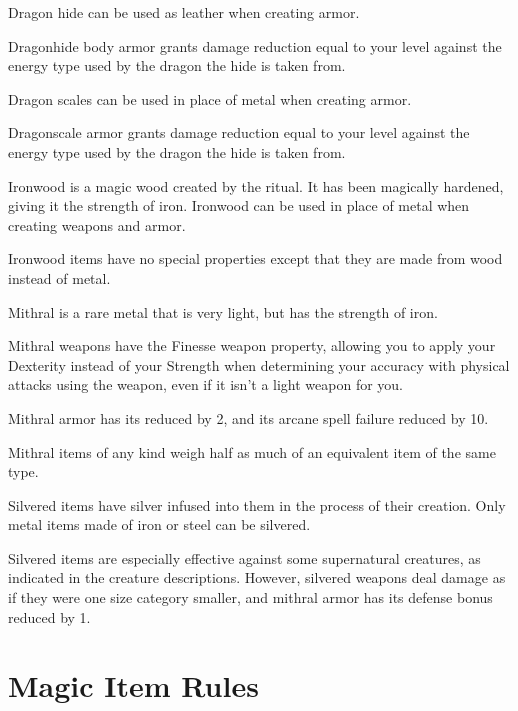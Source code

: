         Dragon hide can be used as leather when creating armor.

        Dragonhide body armor grants damage reduction equal to your level against the energy type used by the dragon the hide is taken from.


        Dragon scales can be used in place of metal when creating armor.

        Dragonscale armor grants damage reduction equal to your level against the energy type used by the dragon the hide is taken from.

        Ironwood is a magic wood created by the  ritual.
        It has been magically hardened, giving it the strength of iron.
        Ironwood can be used in place of metal when creating weapons and armor.

        Ironwood items have no special properties except that they are made from wood instead of metal.

        Mithral is a rare metal that is very light, but has the strength of iron.

        Mithral weapons have the Finesse weapon property, allowing you to apply your Dexterity instead of your Strength when determining your accuracy with physical attacks using the weapon, even if it isn't a light weapon for you.

        Mithral armor has its  reduced by 2, and its arcane spell failure reduced by 10.

        Mithral items of any kind weigh half as much of an equivalent item of the same type.


        Silvered items have silver infused into them in the process of their creation.
        Only metal items made of iron or steel can be silvered.

        Silvered items are especially effective against some supernatural creatures, as indicated in the creature descriptions.
        However, silvered weapons deal damage as if they were one size category smaller, and mithral armor has its defense bonus reduced by 1.

\section{Magic Item Rules}


